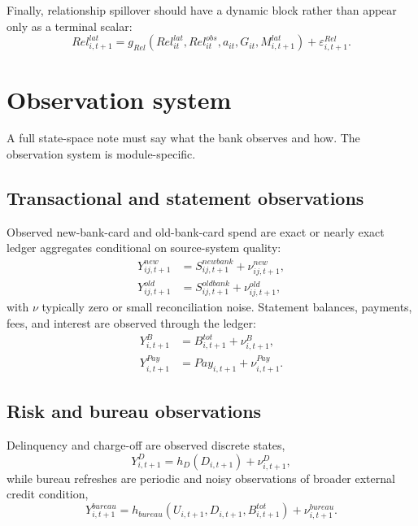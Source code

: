 \documentclass[11pt]{article}
\newcommand{\1}{\mathbf{1}}
\theoremstyle{definition}
\begin{document}
Finally, relationship spillover should have a dynamic block rather than appear
only as a terminal scalar:
\begin{equation}
  Rel^{lat}_{i,t+1}
  =
  g_{Rel}(Rel^{lat}_{it},Rel^{obs}_{it},a_{it},G_{it},M^{lat}_{i,t+1})
  + \varepsilon^{Rel}_{i,t+1}.
  \label{eq:relationship-transition}
\end{equation}

\section{Observation system}

A full state-space note must say what the bank observes and how. The observation
system is module-specific.

\subsection{Transactional and statement observations}

Observed new-bank-card and old-bank-card spend are exact or nearly exact ledger
aggregates conditional on source-system quality:
\begin{align}
  Y_{ij,t+1}^{new} &= S^{newbank}_{ij,t+1} + \nu^{new}_{ij,t+1},
    \label{eq:obs-new-spend}\\
  Y_{ij,t+1}^{old} &= S^{oldbank}_{ij,t+1} + \nu^{old}_{ij,t+1},
    \label{eq:obs-old-spend}
\end{align}
with $\nu$ typically zero or small reconciliation noise. Statement balances,
payments, fees, and interest are observed through the ledger:
\begin{align}
  Y_{i,t+1}^{B} &= B_{i,t+1}^{tot} + \nu^B_{i,t+1},
    \label{eq:obs-balance}\\
  Y_{i,t+1}^{Pay} &= Pay_{i,t+1} + \nu^{Pay}_{i,t+1}.
    \label{eq:obs-payment}
\end{align}

\subsection{Risk and bureau observations}

Delinquency and charge-off are observed discrete states,
\begin{equation}
  Y_{i,t+1}^{D} = h_D(D_{i,t+1}) + \nu^D_{i,t+1},
  \label{eq:obs-delinquency}
\end{equation}
while bureau refreshes are periodic and noisy observations of broader external
credit condition,
\begin{equation}
  Y_{i,t+1}^{bureau}
  =
  h_{bureau}(U_{i,t+1},D_{i,t+1},B_{i,t+1}^{tot}) + \nu^{bureau}_{i,t+1}.
  \label{eq:obs-bureau}
\end{equation}
\end{document}
